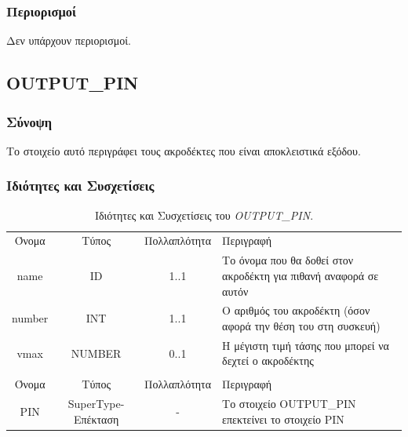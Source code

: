 \subsubsection*{Περιορισμοί}

\noindent Δεν υπάρχουν περιορισμοί.

\subsection{OUTPUT\_PIN}
\label{subsec:output_pin}

\subsubsection*{Σύνοψη}

\noindent Το στοιχείο αυτό περιγράφει τους ακροδέκτες που είναι αποκλειστικά εξόδου.

\subsubsection*{Ιδιότητες και Συσχετίσεις}

\begin{table}[H]
	\begin{center}
		\begin{tabular}{ | c | c | c| m{5.5cm} | }
			\hline
			\rowcolor{Gray}
			\multicolumn{4}{|c|}{\textbf{Ιδιότητες}}\\
			\hline
			\rowcolor{Gray}
			Όνομα & Τύπος & Πολλαπλότητα & Περιγραφή \\
			\hline
			name & ID & 1..1 & Το όνομα που θα δοθεί στον ακροδέκτη για πιθανή αναφορά σε αυτόν \\
			\hline
			number & INT & 1..1 & Ο αριθμός του ακροδέκτη (όσον αφορά την θέση του στη συσκευή) \\
			\hline
			vmax & NUMBER & 0..1 & Η μέγιστη τιμή τάσης που μπορεί να δεχτεί ο ακροδέκτης \\
			\hline
			\rowcolor{Gray}
			\multicolumn{4}{|c|}{\textbf{Συσχετίσεις}}\\
			\hline
			\rowcolor{Gray}
			Όνομα & Τύπος & Πολλαπλότητα & Περιγραφή \\
			\hline
			PIN & SuperType-Επέκταση & - &  Το στοιχείο OUTPUT\_PIN επεκτείνει το στοιχείο PIN \\
			\hline
		\end{tabular}
		\caption{Ιδιότητες και Συσχετίσεις του \textit{OUTPUT\_PIN}.}
		\label{tab:output_pin}
	\end{center}
\end{table}

